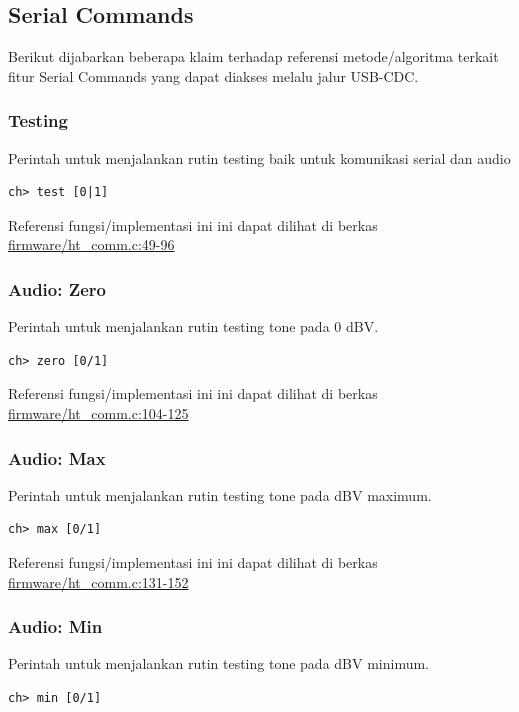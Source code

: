 \documentclass[12pt,]{article}
\begin{document}
	\newpage
	\subsection{Serial Commands}
	
	Berikut dijabarkan beberapa klaim terhadap referensi metode/algoritma terkait fitur Serial Commands yang dapat diakses melalu jalur USB-CDC.
	
	\subsubsection{Testing}
	Perintah untuk menjalankan rutin testing baik untuk komunikasi serial dan audio
	\begin{verbatim}
ch> test [0|1]
	\end{verbatim}

	Referensi fungsi/implementasi ini ini dapat dilihat di berkas
	\href{https://github.com/VibrasticLab/pikoakustik/blob/stm32f401re_3pin/firmware/ht_comm.c#L49-L96}{firmware/ht\_comm.c:49-96}

	\subsubsection{Audio: Zero}
	Perintah untuk menjalankan rutin testing tone pada 0 dBV.
	\begin{verbatim}
ch> zero [0/1]
	\end{verbatim}

	Referensi fungsi/implementasi ini ini dapat dilihat di berkas
	\href{https://github.com/VibrasticLab/pikoakustik/blob/stm32f401re_3pin/firmware/ht_comm.c#L104-L125}{firmware/ht\_comm.c:104-125}

	\subsubsection{Audio: Max}
	Perintah untuk menjalankan rutin testing tone pada dBV maximum.
	\begin{verbatim}
ch> max [0/1]
	\end{verbatim}

	Referensi fungsi/implementasi ini ini dapat dilihat di berkas
	\href{https://github.com/VibrasticLab/pikoakustik/blob/stm32f401re_3pin/firmware/ht_comm.c#L131-L152}{firmware/ht\_comm.c:131-152}
	
	\subsubsection{Audio: Min}
	Perintah untuk menjalankan rutin testing tone pada dBV minimum.
	\begin{verbatim}
ch> min [0/1]
	\end{verbatim}
\end{document}
